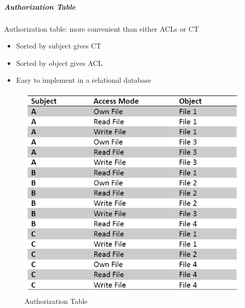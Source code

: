 \documentclass{article}
\begin{document}
                        \subparagraph{Authorization Table} Authorization table: more
                        convenient than either ACLs
                        or CT 
                        \begin{itemize}
                            \item Sorted by subject gives CT
                            \item Sorted by object gives ACL
                            \item Easy to implement in a relational database
                        \end{itemize}
                        
                        \begin{figure}[h]
                            \begin{center}
                                \includegraphics{../immagini/AT.png}
                            \end{center}
                            \caption{Authorization Table}
                        \end{figure}
\end{document}
